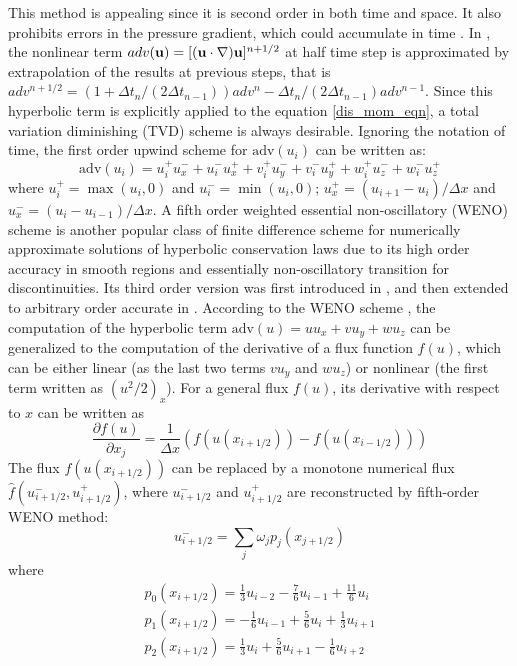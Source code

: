This method is appealing since it is second order in both time and space. It also prohibits errors in the pressure gradient, which could accumulate in time \cite{}. In , the nonlinear term $adv(\mathbf{u}) = [(\mathbf{u}\cdot\nabla)\mathbf{u}]^{n+1/2}$ at half time step is approximated by extrapolation of the results at previous steps, that is $adv^{n+1/2} = (1+\Delta t_n/(2\Delta t_{n-1}))adv^{n} -\Delta t_n/(2\Delta t_{n-1})adv^{n-1}$. Since this hyperbolic term is explicitly applied to the equation \ref{dis_mom_eqn}, a total variation diminishing (TVD) scheme is always desirable. Ignoring the notation of time, the first order upwind scheme for $\text{adv}(u_i)$ can be written as:
\begin{equation}
\text{adv}(u_i) = u_i^+ u_x^- + u_i^- u_x^+ 
	  + v_i^+ u_y^- + v_i^- u_y^+
	  + w_i^+ u_z^- + w_i^- u_z^+
\label{upwind_adv}
\end{equation}
where $u_i^+ = \max(u_i, 0)$ and $u_i^- = \min(u_i, 0)$; $u_x^+ = (u_{i+1}-u_{i})/\Delta x$ and $u_x^- = (u_i - u_{i-1})/\Delta x$.
A fifth order weighted essential non-oscillatory (WENO) scheme is another popular class of finite difference scheme for numerically approximate solutions of hyperbolic conservation laws due to its high order accuracy in smooth regions and essentially non-oscillatory transition for discontinuities. Its third order version was first introduced in \cite{}, and then extended to arbitrary order accurate in \cite{}. According to the WENO scheme \cite{}, the computation of the hyperbolic term $\text{adv}(u) = uu_x + vu_y + wu_z$ can be generalized to the computation of the derivative of a flux function $f(u)$, which can be either linear (as the last two terms 
$vu_y$ and $wu_z$) or nonlinear (the first term written as $(u^2/2)_x$).
For a general flux $f(u)$, its derivative with respect to $x$ can be written as 
\begin{equation}
\frac{\partial f(u)}{\partial x_j} = \frac{1}{\Delta x}(f(u(x_{i+1/2})) - f(u(x_{i-1/2})))
\end{equation}
The flux $f(u(x_{i+1/2}))$ can be replaced by a monotone numerical flux $\hat{f}(u^-_{i+1/2}, u^+_{i+1/2})$, where $u^-_{i+1/2}$ and $u^+_{i+1/2}$ are reconstructed by fifth-order WENO method:
\begin{equation}
u^-_{i+1/2} = \sum_j\omega_jp_j(x_{j+1/2})
\end{equation}
where
\begin{eqnarray}
p_0(x_{i+1/2}) = \frac{1}{3}u_{i-2} - \frac{7}{6}u_{i-1} + \frac{11}{6}u_{i}\\
p_1(x_{i+1/2}) = -\frac{1}{6}u_{i-1} + \frac{5}{6}u_i + \frac{1}{3}u_{i+1}\\
p_2(x_{i+1/2}) = \frac{1}{3}u_i + \frac{5}{6}u_{i+1} - \frac{1}{6}u_{i+2}
\end{eqnarray}

